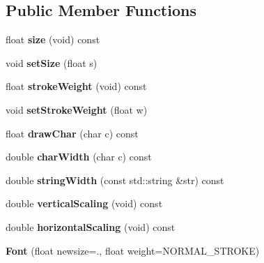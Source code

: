 \subsection*{Public Member Functions}
\begin{DoxyCompactItemize}
\item 
float {\bfseries size} (void) const \hypertarget{classFont_aa1f92bd535e70a3ddec63b1562f13f20}{}\label{classFont_aa1f92bd535e70a3ddec63b1562f13f20}

\item 
void {\bfseries set\+Size} (float s)\hypertarget{classFont_a9b71d856ceaa3b2ad2b499168d8e46eb}{}\label{classFont_a9b71d856ceaa3b2ad2b499168d8e46eb}

\item 
float {\bfseries stroke\+Weight} (void) const \hypertarget{classFont_ada7ce5b68054ffec0b73a139dd1aea4b}{}\label{classFont_ada7ce5b68054ffec0b73a139dd1aea4b}

\item 
void {\bfseries set\+Stroke\+Weight} (float w)\hypertarget{classFont_a6ae112827c60ca12c975373ae65a040b}{}\label{classFont_a6ae112827c60ca12c975373ae65a040b}

\item 
float {\bfseries draw\+Char} (char c) const \hypertarget{classFont_a50f43bb75d949fc657020cf43676964c}{}\label{classFont_a50f43bb75d949fc657020cf43676964c}

\item 
double {\bfseries char\+Width} (char c) const \hypertarget{classFont_ab44f83c7831e439c2f3908141d01769d}{}\label{classFont_ab44f83c7831e439c2f3908141d01769d}

\item 
double {\bfseries string\+Width} (const std\+::string \&str) const \hypertarget{classFont_afee9cd456595ba05ad116f02ae2fb75b}{}\label{classFont_afee9cd456595ba05ad116f02ae2fb75b}

\item 
double {\bfseries vertical\+Scaling} (void) const \hypertarget{classFont_a914a935eeb540581c1568e88687854e6}{}\label{classFont_a914a935eeb540581c1568e88687854e6}

\item 
double {\bfseries horizontal\+Scaling} (void) const \hypertarget{classFont_ab6f63e8febfd6f8ab470ad0b5b677bd2}{}\label{classFont_ab6f63e8febfd6f8ab470ad0b5b677bd2}

\item 
{\bfseries Font} (float newsize=., float weight=N\+O\+R\+M\+A\+L\+\_\+\+S\+T\+R\+O\+KE)\hypertarget{classFont_a92929701abd36716e5e33fbde41f4c10}{}\label{classFont_a92929701abd36716e5e33fbde41f4c10}


\end{DoxyCompactItemize}
